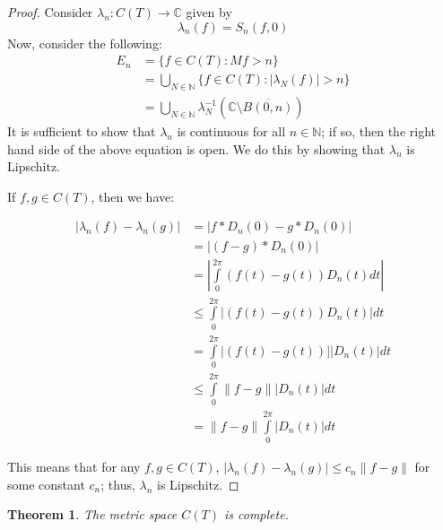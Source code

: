 \documentclass{amsart}
\newcommand{\la}{\lambda}
\newcommand{\C}{\mathbb{C}}
\newcommand{\N}{\mathbb{N}}
\newcommand{\absval}[1]{\left| #1 \right|}
\newcommand{\norm}[1]{\|#1\|}
\newtheorem{thm}{Theorem}[section]
\theoremstyle{definition}
\begin{document}
\begin{proof}
Consider $\la_n: C(T) \to \C$ given by
\begin{displaymath}
\la_n(f) = S_n(f,0)
\end{displaymath}
Now, consider the following:
\begin{align*}
E_n &= \{f \in C(T): Mf> n\} \\
&= \bigcup\limits_{N \in \N} \{f \in C(T) : \absval{\la_N(f)} > n\}\\
&= \bigcup\limits_{N \in \N} \la_N^{-1}(\C \setminus \overline{B(0,n)})
\end{align*}
It is sufficient to show that $\la_n$ is continuous for all $n \in \N$; if so, then the right hand side of the above equation is open.
We do this by showing that $\la_n$ is Lipschitz.

If $f, g \in C(T)$, then we have:

\begin{align*}
\absval{\la_n(f) - \la_n(g)} &= \absval{f \ast D_n(0) - g \ast D_n(0)} \\
&= \absval{(f-g) \ast D_n(0)} \\
&= \absval{\int\limits_0^{2\pi} (f(t)-g(t))D_n(t)dt} \\
&\leq \int\limits_0^{2\pi} \absval{(f(t)-g(t))D_n(t)}dt \\
&= \int\limits_0^{2\pi} \absval{(f(t)-g(t))}\absval{D_n(t)}dt \\
&\leq \int\limits_0^{2\pi} \norm{f-g}\absval{D_n(t)}dt \\
&= \norm{f-g} \int\limits_0^{2\pi} \absval{D_n(t)}dt
\end{align*}

This means that for any $f,g \in C(T)$, $\absval{\la_n(f) - \la_n(g)} \leq c_n \norm{f-g}$ for some constant $c_n$; thus, $\la_n$ is Lipschitz.

\end{proof}

\begin{thm}
The metric space $C(T)$ is complete.
\end{thm}
\end{document}
